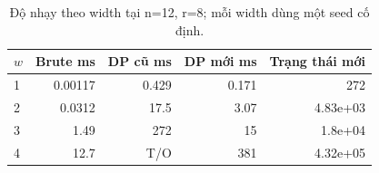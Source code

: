\begin{table}[htbp]
\centering
\small
\setlength{\tabcolsep}{4pt}
\caption{Độ nhạy theo width tại n=12, r=8; mỗi width dùng một seed cố định.}
\label{tab:width-sensitivity}
\begin{tabular}{lrrrr}
\toprule
$w$ & Brute ms & DP cũ ms & DP mới ms & Trạng thái mới \\
\midrule
1 & 0.00117 & 0.429 & 0.171 & 272 \\
2 & 0.0312 & 17.5 & 3.07 & 4.83e+03 \\
3 & 1.49 & 272 & 15 & 1.8e+04 \\
4 & 12.7 & T/O & 381 & 4.32e+05 \\
\bottomrule
\end{tabular}
\end{table}
